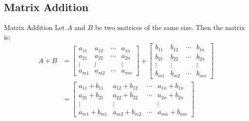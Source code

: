 \documentclass[\main/notes.tex]{subfiles}
\begin{document}
			\subsection{Matrix Addition}
				\begin{definition}{Matrix Addition}
					Let $A$ and $B$ be two matrices of the same size. Then the matrix  is:
					\begin{align*}
						A + B &= \begin{bmatrix}
							a_{11} & a_{12} & \cdots & a_{1n}\\
							a_{21} & a_{22} & \cdots & a_{2n}\\
							\vdots & \vdots & & \vdots\\
							a_{m1} & a_{m2} & \cdots & a_{mn}
						\end{bmatrix} + \begin{bmatrix}
							b_{11} & b_{12} & \cdots & b_{1n}\\
							b_{21} & b_{22} & \cdots & b_{2n}\\
							\vdots & \vdots & & \vdots\\
							b_{m1} & b_{m2} & \cdots & b_{mn}
						\end{bmatrix}\\
						&= \begin{bmatrix}
							a_{11} + b_{11} & a_{12} + b_{12} & \cdots & a_{1n} + b_{1n}\\
							a_{21} + b_{21} & a_{22} + b_{22} & \cdots & a_{2n} + b_{2n}\\
							\vdots & \vdots & & \vdots\\
							a_{m1} + b_{m1} & a_{m2} + b_{m2} & \cdots & a_{mn} + b_{mn}
						\end{bmatrix}
					\end{align*}
				\end{definition}
\end{document}
